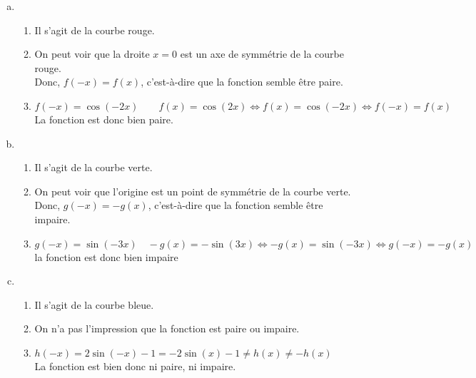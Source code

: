 \documentclass[12pt, a4paper]{article}
\begin{document}
\begin{Exercise}[number={80}]
\begin{center}
\end{center}
    \parbox{\linewidth}{}
    \begin{enumerate}[a)]
        \item   \begin{enumerate}[1)]
                    \item Il s'agit de la courbe rouge.
                    \item On peut voir que la droite $x=0$ est un axe de symmétrie de la courbe rouge. \\ Donc, $f(-x)=f(x)$, c'est-à-dire que la fonction semble être paire.
                    \item $f(-x)=\cos(-2x) \qquad f(x)=\cos(2x)\iff f(x)=\cos(-2x)\iff f(-x)=f(x)$ \\ La fonction est donc bien paire.
                \end{enumerate}\smallbreak
        \item   \begin{enumerate}[1)]
                    \item Il s'agit de la courbe verte.
                    \item On peut voir que l'origine est un point de symmétrie de la courbe verte. \\ Donc, $g(-x)=-g(x)$, c'est-à-dire que la fonction semble être impaire.
                    \item $g(-x)=\sin(-3x) \quad -g(x)=-\sin(3x)\iff -g(x)=\sin(-3x)\iff g(-x)=-g(x)$ \\ la fonction est donc bien impaire
                \end{enumerate}\smallbreak
        \item   \begin{enumerate}[1)]
                    \item Il s'agit de la courbe bleue.
                    \item On n'a pas l'impression que la fonction est paire ou impaire.
                    \item $h(-x)=2\sin(-x)-1=-2\sin(x)-1\neq h(x)\neq -h(x)$ \\ La fonction est bien donc ni paire, ni impaire.

\end{enumerate}
\end{enumerate}
\end{Exercise}
\end{document}
